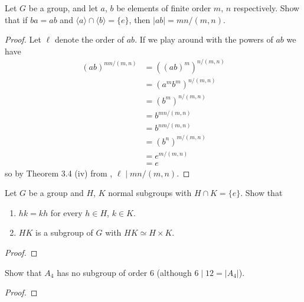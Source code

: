 \begin{problem}
  Let $G$ be a group, and let $a$, $b$ be elements of finite order $m$, $n$
  respectively. Show that if $ba=ab$ and
  $\langle a\rangle\cap\langle b\rangle=\{e\}$, then $|ab|=mn/(m,n)$.
\end{problem}
\begin{proof}
  Let $\ell$ denote the order of $ab$. If we play around with the powers of
  $ab$ we have
  \begin{equation}
    \label{eq:1:4}
    \begin{aligned}
      {(ab)}^{mn/(m,n)}
      &={((ab)^m)}^{n/(m,n)}\\
      &={(a^mb^m)^{n/(m,n)}}\\
      &={(b^m)^{n/(m,n)}}\\
      &=b^{mn/(m,n)}\\
      &=b^{nm/(m,n)}\\
      &={(b^n)}^{m/(m,n)}\\
      &=e^{m/(m,n)}\\
      &=e
    \end{aligned}
  \end{equation}
  so by Theorem 3.4 (iv) from \cite[Ch.\@ I \S 3.3, p.\@ 35]{hungerford},
  $\ell\mid mn/(m,n)$.
\end{proof}

\begin{problem}
  Let $G$ be a group and $H$, $K$ normal subgroups with $H\cap
  K=\{e\}$. Show that
  \begin{enumerate}[label=(\alph*),noitemsep]
  \item $hk=kh$ for every $h\in H$, $k\in K$.
  \item $HK$ is a subgroup of $G$ with $HK\simeq H\times K$.
  \end{enumerate}
\end{problem}
\begin{proof}
\end{proof}

\begin{problem}
  Show that $A_4$ has no subgroup of order $6$ (although $6\mid 12=|A_4|$).
\end{problem}
\begin{proof}
\end{proof}

